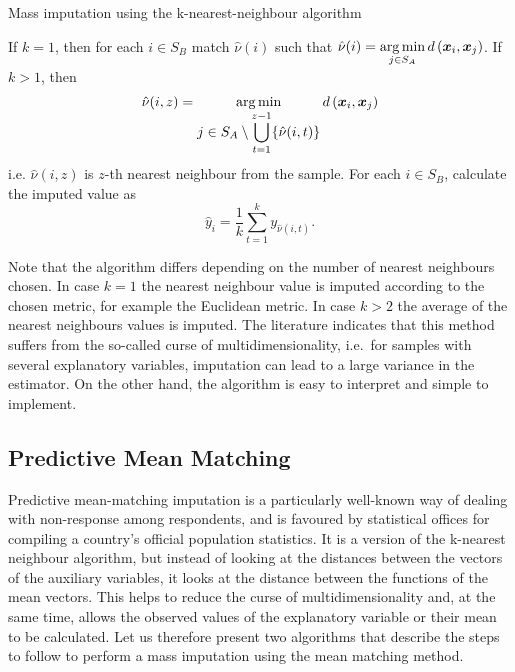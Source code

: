 \documentclass[
]{jss}
\begin{document}
\begin{algorithm}[H]
\caption{Mass imputation using the k-nearest-neighbour algorithm}
\label{algo-2}
\begin{algorithmic}[1]
\State If $k=1$, then for each $i \in S_B$ match $\hat{\nu}(i)$ such that
$\displaystyle \hat{\nu}(i)=
\operatornamewithlimits{arg\,min}_{j\in S_{A}}d\left(\boldsymbol{x}_i,\boldsymbol{x}_j\right)$.
\State If $k>1$, then
$$\hat{\nu}(i, z) = \operatornamewithlimits{arg\,min}_{\displaystyle j\in S_{A}\setminus\bigcup_{t=1}^{z-1}
\{\hat{\nu}(i, t)\}} d\left(\boldsymbol{x}_i, \boldsymbol{x}_j\right)$$
i.e. $\hat{\nu}(i, z)$ is $z$-th nearest neighbour from the sample.\;
\State For each $i \in S_B$, calculate the imputed value as
$$
\hat{y}_i = \frac{1}{k}\sum_{t=1}^{k}y_{\hat{\nu}(i, t)}.
$$
\end{algorithmic}
\end{algorithm}

Note that the algorithm differs depending on the number of nearest
neighbours chosen. In case \(k=1\) the nearest neighbour value is
imputed according to the chosen metric, for example the Euclidean
metric. In case \(k>2\) the average of the nearest neighbours values is
imputed. The literature indicates that this method suffers from the
so-called curse of multidimensionality, i.e.~for samples with several
explanatory variables, imputation can lead to a large variance in the
estimator. On the other hand, the algorithm is easy to interpret and
simple to implement.

\hypertarget{predictive-mean-matching}{%
\subsection{Predictive Mean Matching}\label{predictive-mean-matching}}

Predictive mean-matching imputation is a particularly well-known way of
dealing with non-response among respondents, and is favoured by
statistical offices for compiling a country's official population
statistics. It is a version of the k-nearest neighbour algorithm, but
instead of looking at the distances between the vectors of the auxiliary
variables, it looks at the distance between the functions of the mean
vectors. This helps to reduce the curse of multidimensionality and, at
the same time, allows the observed values of the explanatory variable or
their mean to be calculated. Let us therefore present two algorithms
that describe the steps to follow to perform a mass imputation using the
mean matching method.
\end{document}
